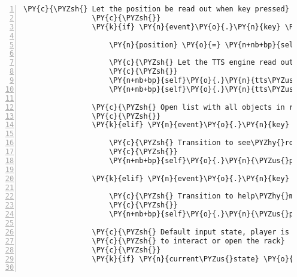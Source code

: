 \begin{Verbatim}[commandchars=\\\{\},numbers=left,firstnumber=1,stepnumber=1]
                \PY{c}{\PYZsh{} Let the position be read out when key pressed}
                \PY{c}{\PYZsh{}}
                \PY{k}{if} \PY{n}{event}\PY{o}{.}\PY{n}{key} \PY{o}{==} \PY{n}{pygame}\PY{o}{.}\PY{n}{K\PYZus{}x}\PY{p}{:}

                    \PY{n}{position} \PY{o}{=} \PY{n+nb+bp}{self}\PY{o}{.}\PY{n}{host}\PY{o}{.}\PY{n}{room}\PY{o}{.}\PY{n}{entity\PYZus{}locations}\PY{p}{[}\PY{n+nb+bp}{self}\PY{o}{.}\PY{n}{host}\PY{o}{.}\PY{n}{client\PYZus{}id}\PY{p}{]}

                    \PY{c}{\PYZsh{} Let the TTS engine read out the current client position}
                    \PY{c}{\PYZsh{}}
                    \PY{n+nb+bp}{self}\PY{o}{.}\PY{n}{tts\PYZus{}engine}\PY{o}{.}\PY{n}{say}\PY{p}{(}\PY{n}{position}\PY{p}{,} \PY{l+s}{\PYZsq{}}\PY{l+s}{position}\PY{l+s}{\PYZsq{}}\PY{p}{)}
                    \PY{n+nb+bp}{self}\PY{o}{.}\PY{n}{tts\PYZus{}engine}\PY{o}{.}\PY{n}{runAndWait}\PY{p}{(}\PY{p}{)}

                \PY{c}{\PYZsh{} Open list with all objects in room}
                \PY{c}{\PYZsh{}}
                \PY{k}{elif} \PY{n}{event}\PY{o}{.}\PY{n}{key} \PY{o}{==} \PY{n}{pygame}\PY{o}{.}\PY{n}{K\PYZus{}z}\PY{p}{:} \PY{c}{\PYZsh{} English keyboard layout for \PYZdq{}y\PYZdq{}}

                    \PY{c}{\PYZsh{} Transition to see\PYZhy{}room\PYZhy{}input\PYZhy{}state}
                    \PY{c}{\PYZsh{}}
                    \PY{n+nb+bp}{self}\PY{o}{.}\PY{n}{\PYZus{}push\PYZus{}input\PYZus{}state\PYZus{}on\PYZus{}stack}\PY{p}{(}\PY{n+nb+bp}{self}\PY{o}{.}\PY{n}{INPUT\PYZus{}STATE\PYZus{}SEE\PYZus{}ROOM}\PY{p}{)}

                \PY{k}{elif} \PY{n}{event}\PY{o}{.}\PY{n}{key} \PY{o}{==} \PY{n}{pygame}\PY{o}{.}\PY{n}{K\PYZus{}F1}\PY{p}{:}

                    \PY{c}{\PYZsh{} Transition to help\PYZhy{}menu\PYZhy{}input\PYZhy{}state}
                    \PY{c}{\PYZsh{}}
                    \PY{n+nb+bp}{self}\PY{o}{.}\PY{n}{\PYZus{}push\PYZus{}input\PYZus{}state\PYZus{}on\PYZus{}stack}\PY{p}{(}\PY{n+nb+bp}{self}\PY{o}{.}\PY{n}{INPUT\PYZus{}STATE\PYZus{}HELP\PYZus{}MENU}\PY{p}{)}

                \PY{c}{\PYZsh{} Default input state, player is in room and can move or start}
                \PY{c}{\PYZsh{} to interact or open the rack}
                \PY{c}{\PYZsh{}}
                \PY{k}{if} \PY{n}{current\PYZus{}state} \PY{o}{==} \PY{n+nb+bp}{self}\PY{o}{.}\PY{n}{INPUT\PYZus{}STATE\PYZus{}IN\PYZus{}ROOM}\PY{p}{:}


\end{Verbatim}
